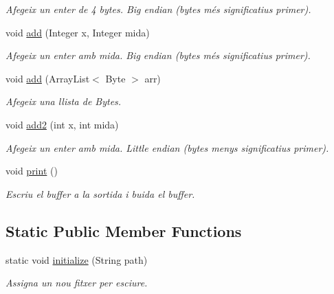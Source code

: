 \begin{DoxyCompactItemize}
\begin{DoxyCompactList}\small\item\em Afegeix un enter de 4 bytes. Big endian (bytes més significatius primer). \end{DoxyCompactList}\item 
void \hyperlink{classpersistencia_1_1output_1_1Ctrl__Output_ac792cc55e30c9c769e10a20c2dd41bc8}{add} (Integer x, Integer mida)
\begin{DoxyCompactList}\small\item\em Afegeix un enter amb mida. Big endian (bytes més significatius primer). \end{DoxyCompactList}\item 
void \hyperlink{classpersistencia_1_1output_1_1Ctrl__Output_a5fb2f07198a77b4fac0f95ee48e3d0b9}{add} (Array\+List$<$ Byte $>$ arr)
\begin{DoxyCompactList}\small\item\em Afegeix una llista de Bytes. \end{DoxyCompactList}\item 
void \hyperlink{classpersistencia_1_1output_1_1Ctrl__Output_ad4738467c2312b0e079c14003e548dd6}{add2} (int x, int mida)
\begin{DoxyCompactList}\small\item\em Afegeix un enter amb mida. Little endian (bytes menys significatius primer). \end{DoxyCompactList}\item 
void \hyperlink{classpersistencia_1_1output_1_1Ctrl__Output_a908955c29bfecc7ebac86613bc75e9ed}{print} ()
\begin{DoxyCompactList}\small\item\em Escriu el buffer a la sortida i buida el buffer. \end{DoxyCompactList}\end{DoxyCompactItemize}
\subsection*{Static Public Member Functions}
\begin{DoxyCompactItemize}
\item 
static void \hyperlink{classpersistencia_1_1output_1_1Ctrl__Output_a83bd01197acdeb0a697f21ca9854c457}{initialize} (String path)
\begin{DoxyCompactList}\small\item\em Assigna un nou fitxer per esciure. \end{DoxyCompactList}\end{DoxyCompactItemize}


